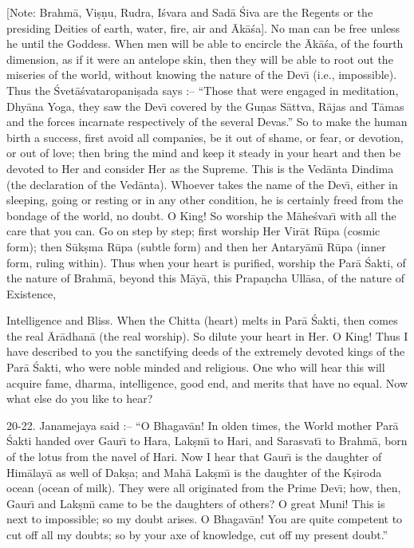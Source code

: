 [Note: Brahm\=a, Vi\d{s}\d{n}u, Rudra, I\'svara and Sad\=a \'Siva are the Regents or the presiding Deities of earth, water, fire, air and \=Ak\=a\'sa]. No man can be free unless he until the Goddess. When men will be able to encircle the \=Ak\=a\'sa, of the fourth dimension, as if it were an antelope skin, then they will be able to root out the miseries of the world, without knowing the nature of the Dev\={\i} (i.e., impossible). Thus the \'Svet\=a\'svataropani\d{s}ada says :-- ``Those that were engaged in meditation, Dhy\=ana Yoga, they saw the Dev\={\i} covered by the Gu\d{n}as S\=attva, R\=ajas and T\=amas and the forces incarnate respectively of the several Devas.'' So to make the human birth a success, first avoid all companies, be it out of shame, or fear, or devotion, or out of love; then bring the mind and keep it steady in your heart and then be devoted to Her and consider Her as the Supreme. This is the Ved\=anta Dindima (the declaration of the Ved\=anta). Whoever takes the name of the Dev\={\i}, either in sleeping, going or resting or in any other condition, he is certainly freed from the bondage of the world, no doubt. O King! So worship the M\=ahe\'svar\={\i} with all the care that you can. Go on step by step; first worship Her Vir\=at R\=upa (cosmic form); then S\=uk\d{s}ma R\=upa (subtle form) and then her Antary\=am\={\i} R\=upa (inner form, ruling within). Thus when your heart is purified, worship the Par\=a \'Sakti, of the nature of Brahm\=a, beyond this M\=ay\=a, this Prapa\d{n}cha Ull\=asa, of the nature of Existence,

Intelligence and Bliss. When the Chitta (heart) melts in Par\=a \'Sakti, then comes the real \=Ar\=adhan\=a (the real worship). So dilute your heart in Her. O King! Thus I have described to you the sanctifying deeds of the extremely devoted kings of the Par\=a \'Sakti, who were noble minded and religious. One who will hear this will acquire fame, dharma, intelligence, good end, and merits that have no equal. Now what else do you like to hear?

20-22. Janamejaya said :-- ``O Bhagav\=an! In olden times, the World mother Par\=a \'Sakti handed over Gaur\={\i} to Hara, Lak\d{s}m\={\i} to Hari, and Sarasvat\={\i} to Brahm\=a, born of the lotus from the navel of Hari. Now I hear that Gaur\={\i} is the daughter of Him\=alay\=a as well of Dak\d{s}a; and Mah\=a Lak\d{s}m\={\i} is the daughter of the K\d{s}iroda ocean (ocean of milk). They were all originated from the Prime Dev\={\i}; how, then, Gaur\={\i} and Lak\d{s}m\={\i} came to be the daughters of others? O great Muni! This is next to impossible; so my doubt arises. O Bhagav\=an! You are quite competent to cut off all my doubts; so by your axe of knowledge, cut off my present doubt.''

